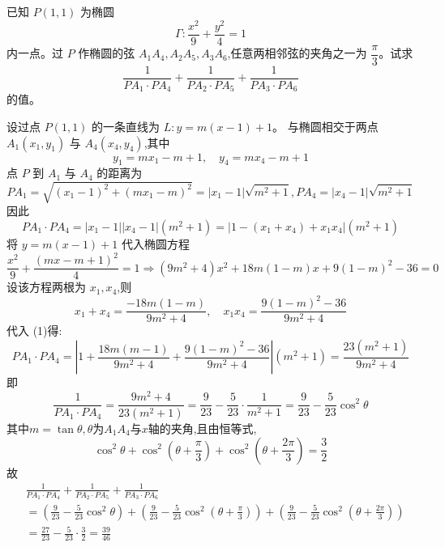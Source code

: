 \begin{questions}
    \question 已知 $P(1,1)$ 为椭圆 $$\Gamma: \frac{x^2}{9} + \frac{y^2}{4} = 1$$ 内一点。过 $P$ 作椭圆的弦 ${A_1A_4},{A_2A_5},{A_3A_6}$,任意两相邻弦的夹角之一为 $\dfrac{\pi}{3}$。试求
    \[
    \frac{1}{PA_1 \cdot PA_4} + \frac{1}{PA_2 \cdot PA_5} + \frac{1}{PA_3 \cdot PA_6}
    \]
    的值。
    \begin{solution}
        设过点 $P(1,1)$ 的一条直线为 $L: y = m(x - 1) + 1$。  
        与椭圆相交于两点 $A_1(x_1, y_1)$ 与 $A_4(x_4, y_4)$,其中
        \[
        y_1 = mx_1 - m + 1,\quad y_4 = mx_4 - m + 1
        \]
        点 $P$ 到 $A_1$ 与 $A_4$ 的距离为
        \[
        PA_1 = \sqrt{(x_1 - 1)^2 + (mx_1 - m)^2}
         = |x_1 - 1|\sqrt{m^2 + 1},PA_4 = |x_4 - 1|\sqrt{m^2 + 1}
        \]
        因此
        \[
        PA_1 \cdot PA_4 = |x_1 - 1||x_4 - 1|(m^2 + 1)= |1 - (x_1 + x_4) + x_1 x_4|(m^2 + 1)
        \tag{1}
        \]
        将 $y = m(x - 1) + 1$ 代入椭圆方程
        \[
        \frac{x^2}{9} + \frac{(mx - m + 1)^2}{4} = 1
        \Rightarrow
        (9m^2 + 4)x^2 + 18m(1 - m)x + 9(1 - m)^2 - 36 = 0
        \]
        设该方程两根为 $x_1, x_4$,则
        \[
        x_1 + x_4 = \frac{-18m(1 - m)}{9m^2 + 4},\quad
        x_1 x_4 = \frac{9(1 - m)^2 - 36}{9m^2 + 4}
        \]
        代入 (1)得:
        \[
        PA_1 \cdot PA_4 = \left|1 + \frac{18m(m - 1)}{9m^2 + 4} + \frac{9(1 - m)^2 - 36}{9m^2 + 4}\right|(m^2 + 1)
        = \frac{23(m^2 + 1)}{9m^2 + 4}
        \]
        即
        \[
        \frac{1}{PA_1 \cdot PA_4} = \frac{9m^2 + 4}{23(m^2 + 1)} = \frac{9}{23} - \frac{5}{23} \cdot \frac{1}{m^2 + 1} = \frac{9}{23} - \frac{5}{23} \cos^2 \theta
        \]
        其中$m = \tan \theta,\theta$为${A_1A_4}$与$x$轴的夹角,且由恒等式,
        \[
        \cos^2 \theta + \cos^2\left(\theta + \frac{\pi}{3}\right) + \cos^2\left(\theta + \frac{2\pi}{3}\right) = \frac{3}{2}
        \]
        故
        \[
        \begin{aligned}
        &\frac{1}{PA_1 \cdot PA_4} + \frac{1}{PA_2 \cdot PA_5} + \frac{1}{PA_3 \cdot PA_6} \\
        &= \left( \frac{9}{23} - \frac{5}{23} \cos^2 \theta \right)
        + \left( \frac{9}{23} - \frac{5}{23} \cos^2\left(\theta + \frac{\pi}{3}\right) \right)
        + \left( \frac{9}{23} - \frac{5}{23} \cos^2\left(\theta + \frac{2\pi}{3}\right) \right) \\
        &= \frac{27}{23} - \frac{5}{23} \cdot \frac{3}{2} =\frac{39}{46}
        \end{aligned}
        \]
    \end{solution}


\end{questions}
